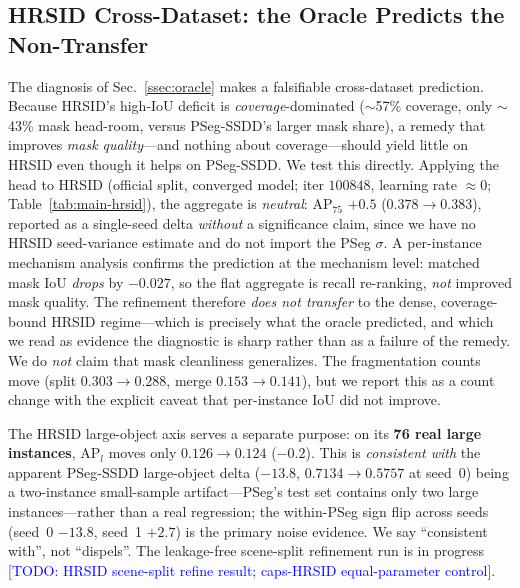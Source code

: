 \documentclass[journal]{IEEEtran}
\newcommand{\TODO}[1]{\textcolor{blue}{[TODO: #1]}}
\begin{document}
\subsection{HRSID Cross-Dataset: the Oracle Predicts the Non-Transfer}
\label{ssec:hrsid}
The diagnosis of Sec.~\ref{ssec:oracle} makes a falsifiable cross-dataset prediction. Because HRSID's high-IoU deficit is \emph{coverage}-dominated ($\sim$57\% coverage, only $\sim$43\% mask head-room, versus PSeg-SSDD's larger mask share), a remedy that improves \emph{mask quality}---and nothing about coverage---should yield little on HRSID even though it helps on PSeg-SSDD. We test this directly. Applying the head to HRSID (official split, converged model; iter $100848$, learning rate $\approx0$; Table~\ref{tab:main-hrsid}), the aggregate is \emph{neutral}: AP$_{75}$ $+0.5$ ($0.378\!\rightarrow\!0.383$), reported as a single-seed delta \emph{without} a significance claim, since we have no HRSID seed-variance estimate and do not import the PSeg $\sigma$. A per-instance mechanism analysis confirms the prediction at the mechanism level: matched mask IoU \emph{drops} by $-0.027$, so the flat aggregate is recall re-ranking, \emph{not} improved mask quality. The refinement therefore \emph{does not transfer} to the dense, coverage-bound HRSID regime---which is precisely what the oracle predicted, and which we read as evidence the diagnostic is sharp rather than as a failure of the remedy. We do \emph{not} claim that mask cleanliness generalizes. The fragmentation counts move (split $0.303\!\rightarrow\!0.288$, merge $0.153\!\rightarrow\!0.141$), but we report this as a count change with the explicit caveat that per-instance IoU did not improve.

The HRSID large-object axis serves a separate purpose: on its \textbf{76 real large instances}, AP$_{l}$ moves only $0.126\!\rightarrow\!0.124$ ($-0.2$). This is \emph{consistent with} the apparent PSeg-SSDD large-object delta ($-13.8$, $0.7134\!\rightarrow\!0.5757$ at seed~0) being a two-instance small-sample artifact---PSeg's test set contains only two large instances---rather than a real regression; the within-PSeg sign flip across seeds (seed~0 $-13.8$, seed~1 $+2.7$) is the primary noise evidence. We say ``consistent with'', not ``dispels''. The leakage-free scene-split refinement run is in progress \TODO{HRSID scene-split refine result; caps-HRSID equal-parameter control}.
\end{document}
